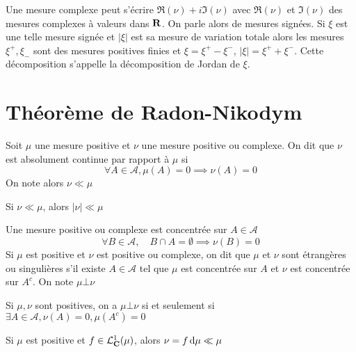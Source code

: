 \begin{rem}
    Une mesure complexe peut s'écrire $\Re(\nu)+i\Im(\nu)$ avec $\Re(\nu)$ et $\Im(\nu)$ des mesures complexes à valeurs dans $ \mathbf R$. On parle alors de mesures signées. Si $\xi$ est une telle mesure signée et $|\xi|$ est sa mesure de variation totale alors les mesures $\xi^+, \xi_-$ sont des mesures positives finies et $\xi=\xi^+-\xi^-$, $|\xi|=\xi^++\xi^-$. Cette décomposition s'appelle la décomposition de Jordan de $\xi$.
\end{rem}

\section{Théorème de Radon-Nikodym}

\begin{dfn}
    Soit $\mu$ une mesure positive et  $\nu$ une mesure positive ou complexe. On dit que  $\nu$ est absolument continue par rapport à  $\mu$ si  \[
        \forall  A \in  \mathcal  A, \mu(A)=0 \implies \nu(A)=0
    \] 
    On note alors $\nu \ll \mu$
\end{dfn}

\begin{rem}
Si $\nu \ll \mu$, alors  $|\nu|\ll\mu$
\end{rem}

\begin{dfn}
    Une mesure positive ou complexe est concentrée sur $A \in  \mathcal  A$ \[
        \forall  B \in  \mathcal A, \quad  B\cap A=\emptyset \implies \nu(B)=0
    \] 
    Si $\mu$ est positive et  $\nu$ est positive ou complexe, on dit que  $\mu$ et  $\nu$ sont étrangères ou singulières  s'il existe  $A \in  \mathcal  A$ tel que $\mu$ est concentrée sur  $A$ et  $\nu$ est concentrée sur  $A^c$. On note  $\mu\bot\nu$
\end{dfn}

\begin{rem}
    Si $\mu, \nu$ sont positives, on a $\mu\bot \nu$  si et seulement si $ \exists  A \in  \mathcal  A, \nu(A)=0, \mu(A^c)=0$
\end{rem}

\begin{ex}
    Si $\mu$ est positive et  $f \in  \mathcal  L^1_{\mathbf C}(\mu)$, alors $\nu=f\mathop{}\!\mathrm d \mu\ll\mu$
\end{ex}

